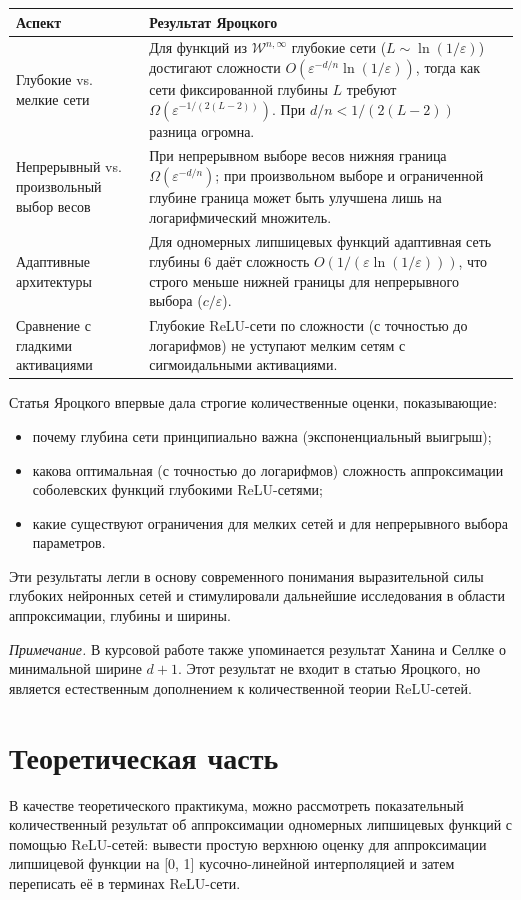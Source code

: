\documentclass[12pt]{article}
\begin{document}
	\begin{tabular}{|p{5cm}|p{9cm}|}
		\hline
		\textbf{Аспект} & \textbf{Результат Яроцкого} \\
		\hline
		Глубокие vs. мелкие сети & Для функций из \(\mathcal{W}^{n,\infty}\) глубокие сети (\(L\sim\ln(1/\varepsilon)\)) достигают сложности \(O(\varepsilon^{-d/n}\ln(1/\varepsilon))\), тогда как сети фиксированной глубины \(L\) требуют \(\Omega(\varepsilon^{-1/(2(L-2))})\). При \(d/n < 1/(2(L-2))\) разница огромна. \\
		\hline
		Непрерывный vs. произвольный выбор весов & При непрерывном выборе весов нижняя граница \(\Omega(\varepsilon^{-d/n})\); при произвольном выборе и ограниченной глубине граница может быть улучшена лишь на логарифмический множитель. \\
		\hline
		Адаптивные архитектуры & Для одномерных липшицевых функций адаптивная сеть глубины 6 даёт сложность \(O(1/(\varepsilon\ln(1/\varepsilon)))\), что строго меньше нижней границы для непрерывного выбора (\(c/\varepsilon\)). \\
		\hline
		Сравнение с гладкими активациями & Глубокие ReLU-сети по сложности (с точностью до логарифмов) не уступают мелким сетям с сигмоидальными активациями. \\
		\hline
	\end{tabular}
	
\vspace{5mm}
	Статья Яроцкого впервые дала строгие количественные оценки, показывающие:
	\begin{itemize}
		\item почему глубина сети принципиально важна (экспоненциальный выигрыш);
		\item какова оптимальная (с точностью до логарифмов) сложность аппроксимации соболевских функций глубокими ReLU-сетями;
		\item какие существуют ограничения для мелких сетей и для непрерывного выбора параметров.
	\end{itemize}
	Эти результаты легли в основу современного понимания выразительной силы глубоких нейронных сетей и стимулировали дальнейшие исследования в области аппроксимации, глубины и ширины.
	
	\medskip
	\noindent\textit{Примечание.} В курсовой работе также упоминается результат Ханина и Селлке о минимальной ширине \(d+1\). Этот результат не входит в статью Яроцкого, но является естественным дополнением к количественной теории ReLU-сетей.
	
	\section{Теоретическая часть}
	В качестве теоретического практикума, можно рассмотреть показательный количественный результат об аппроксимации одномерных липшицевых функций с помощью ReLU-сетей: вывести простую верхнюю оценку для аппроксимации липшицевой функции
	на [0, 1] кусочно-линейной интерполяцией и затем переписать её в терминах
	\vspace{5mm}
	ReLU-сети.
	
\end{document}
